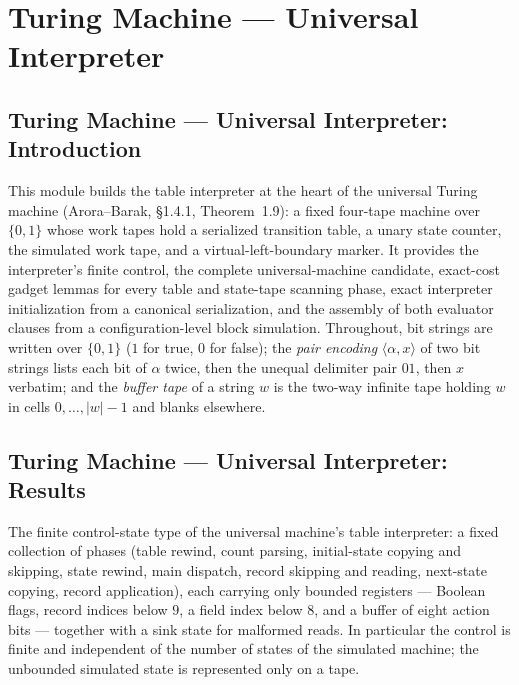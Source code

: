 \section{Turing Machine --- Universal Interpreter}
\subsection*{Turing Machine --- Universal Interpreter: Introduction}

This module builds the table interpreter at the heart of the universal Turing
machine (Arora--Barak, \S 1.4.1, Theorem~1.9): a fixed four-tape machine over
$\{0,1\}$ whose work tapes hold a serialized transition table, a unary state
counter, the simulated work tape, and a virtual-left-boundary marker.  It
provides the interpreter's finite control, the complete universal-machine
candidate, exact-cost gadget lemmas for every table and state-tape scanning
phase, exact interpreter initialization from a canonical serialization, and
the assembly of both evaluator clauses from a configuration-level block
simulation.  Throughout, bit strings are written over $\{0,1\}$ ($1$ for true,
$0$ for false); the \emph{pair encoding} $\langle \alpha, x\rangle$ of two bit
strings lists each bit of $\alpha$ twice, then the unequal delimiter pair
$01$, then $x$ verbatim; and the \emph{buffer tape} of a string $w$ is the
two-way infinite tape holding $w$ in cells $0,\dots,|w|-1$ and blanks
elsewhere.

\subsection*{Turing Machine --- Universal Interpreter: Results}

\begin{definition}
\label{Turing.UniversalControl}
\leanok
The finite control-state type of the universal machine's table interpreter: a
fixed collection of phases (table rewind, count parsing, initial-state copying
and skipping, state rewind, main dispatch, record skipping and reading,
next-state copying, record application), each carrying only bounded registers
--- Boolean flags, record indices below $9$, a field index below $8$, and a
buffer of eight action bits --- together with a sink state for malformed
reads.  In particular the control is finite and independent of the number of
states of the simulated machine; the unbounded simulated state is represented
only on a tape.
\end{definition}

